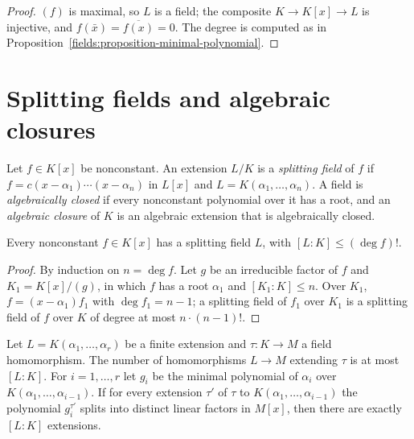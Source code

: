 \begin{proof}
$(f)$ is maximal, so $L$ is a field; the composite $K \to K[x] \to L$ is injective, and
$f(\bar x) = \overline{f(x)} = 0$. The degree is computed as in
Proposition~\ref{fields:proposition-minimal-polynomial}.
\end{proof}

\section{Splitting fields and algebraic closures}\label{fields:section-splitting}

\begin{definition}\label{fields:definition-splitting-field}
Let $f \in K[x]$ be nonconstant. An extension $L/K$ is a \emph{splitting field} of $f$ if
$f = c(x - \alpha_1) \cdots (x - \alpha_n)$ in $L[x]$ and $L = K(\alpha_1, \ldots, \alpha_n)$. A field is
\emph{algebraically closed} if every nonconstant polynomial over it has a root, and an
\emph{algebraic closure} of $K$ is an algebraic extension that is algebraically closed.
\end{definition}

\begin{proposition}\label{fields:proposition-splitting-exists}
Every nonconstant $f \in K[x]$ has a splitting field $L$, with $[L : K] \leq (\deg f)!$.
\end{proposition}

\begin{proof}
By induction on $n = \deg f$. Let $g$ be an irreducible factor of $f$ and
$K_1 = K[x]/(g)$, in which $f$ has a root $\alpha_1$ and $[K_1 : K] \leq n$. Over $K_1$,
$f = (x - \alpha_1) f_1$ with $\deg f_1 = n - 1$; a splitting field of $f_1$ over $K_1$ is a
splitting field of $f$ over $K$ of degree at most $n \cdot (n-1)!$.
\end{proof}

\begin{theorem}\label{fields:theorem-extension}
Let $L = K(\alpha_1, \ldots, \alpha_r)$ be a finite extension and $\tau \colon K \to M$ a field
homomorphism. The number of homomorphisms $L \to M$ extending $\tau$ is at most $[L : K]$.
For $i = 1, \ldots, r$ let $g_i$ be the minimal polynomial of $\alpha_i$ over
$K(\alpha_1, \ldots, \alpha_{i-1})$. If for every extension $\tau'$ of $\tau$ to
$K(\alpha_1, \ldots, \alpha_{i-1})$ the polynomial $g_i^{\tau'}$ splits into distinct linear factors
in $M[x]$, then there are exactly $[L : K]$ extensions.
\end{theorem}

